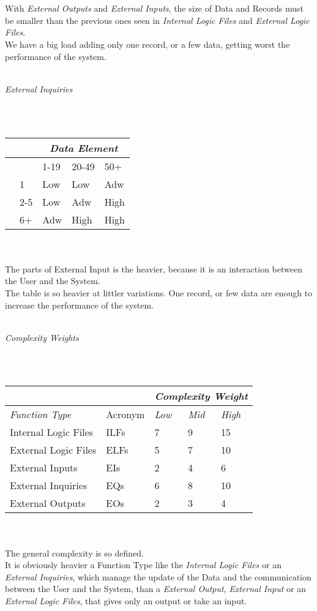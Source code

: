 \documentclass[11pt,a4paper]{report}
\begin{document}
\\\\
With \textit{External Outputs} and \textit{External Inputs}, the size of Data and Records must be smaller than the previous ones seen in \textit{Internal Logic Files} and \textit{External Logic Files}.\\We have a big load adding only one record, or a few data, getting worst the performance of the system.
\\\\
\centerline{\textit{External Inquiries}}
\\\\
\begin{tabularx}{\textwidth}{|p{1cm}|X|X|X|X|}
	\hline
	\multicolumn{2}{|X|}{} & \multicolumn{3}{c|}{\textit{Data Element}}\\
	\hline
	\multirow{1}{*}{}& & 1-19 & 20-49 & 50+\\ \cline{2-5}	
	\multirow{3}{*}{\rotatebox[origin=c]{90}{\parbox{10mm}{Record\\Elements}}}  & 1 & Low & Low & Adw\\
	& 2-5 & Low & Adw & High\\
	& 6+ & Adw & High & High\\
	\hline
\end{tabularx}
\\\\
The parts of External Input is the heavier, because it is an interaction between the User and the System.\\
The table is so heavier at littler variations. One record, or few data are enough to increase the performance of the system. 
\\\\
\centerline{\textit{Complexity Weights}}
\\\\
\begin{tabularx}{\textwidth}{|l|l|X|X|X|}
	\hline
	\multicolumn{2}{|X|}{} & \multicolumn{3}{c|}{\textit{Complexity Weight}}\\
	\hline
	\textit{Function Type} & Acronym & \textit{Low} & \textit{Mid} & \textit{High}\\
	\hline
	Internal Logic Files & ILFs & 7 & 9 & 15\\
	External Logic Files & ELFs & 5 & 7 & 10\\
	External Inputs & EIs & 2 & 4 & 6\\
	External Inquiries & EQs & 6 & 8 & 10\\
	External Outputs & EOs & 2 & 3 & 4\\
	\hline
\end{tabularx}
\\\\
The general complexity is so defined.\\
It is obviously heavier a Function Type like the \textit{Internal Logic Files} or an \textit{External Inquiries}, which manage the update of the Data and the communication between the User and the System, than a \textit{External Output}, \textit{External Input} or an \textit{External Logic Files}, that gives only an output or take an input.\\
\end{document}
